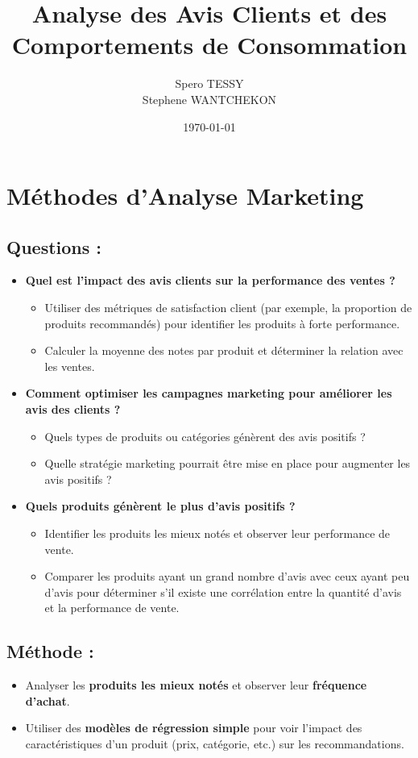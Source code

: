 \documentclass{article}
\title{Analyse des Avis Clients et des Comportements de Consommation}
\author{Spero TESSY \\ Stephene WANTCHEKON}
\date{\today}
\begin{document}
	
	\maketitle
	
	\section{Méthodes d'Analyse Marketing}
	
	\subsection{Questions :}
	\begin{itemize}
		\item \textbf{Quel est l'impact des avis clients sur la performance des ventes ?}
		\begin{itemize}
			\item Utiliser des métriques de satisfaction client (par exemple, la proportion de produits recommandés) pour identifier les produits à forte performance.
			\item Calculer la moyenne des notes par produit et déterminer la relation avec les ventes.
		\end{itemize}
		
		\item \textbf{Comment optimiser les campagnes marketing pour améliorer les avis des clients ?}
		\begin{itemize}
			\item Quels types de produits ou catégories génèrent des avis positifs ?
			\item Quelle stratégie marketing pourrait être mise en place pour augmenter les avis positifs ?
		\end{itemize}
		
		\item \textbf{Quels produits génèrent le plus d'avis positifs ?}
		\begin{itemize}
			\item Identifier les produits les mieux notés et observer leur performance de vente.
			\item Comparer les produits ayant un grand nombre d'avis avec ceux ayant peu d'avis pour déterminer s'il existe une corrélation entre la quantité d'avis et la performance de vente.
		\end{itemize}
	\end{itemize}
	
	\subsection{Méthode :}
	\begin{itemize}
		\item Analyser les \textbf{produits les mieux notés} et observer leur \textbf{fréquence d'achat}.
		\item Utiliser des \textbf{modèles de régression simple} pour voir l'impact des caractéristiques d'un produit (prix, catégorie, etc.) sur les recommandations.
	\end{itemize}
	
\end{document}
